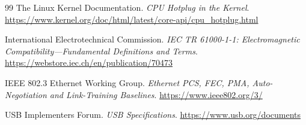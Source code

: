 \begin{thebibliography}{99}
The Linux Kernel Documentation.
\emph{CPU Hotplug in the Kernel}.
\url{https://www.kernel.org/doc/html/latest/core-api/cpu_hotplug.html}

International Electrotechnical Commission.
\emph{IEC TR 61000-1-1: Electromagnetic Compatibility---Fundamental Definitions and Terms}.
\url{https://webstore.iec.ch/en/publication/70473}

IEEE 802.3 Ethernet Working Group.
\emph{Ethernet PCS, FEC, PMA, Auto-Negotiation and Link-Training Baselines}.
\url{https://www.ieee802.org/3/}

USB Implementers Forum.
\emph{USB Specifications}.
\url{https://www.usb.org/documents}

\end{thebibliography}
